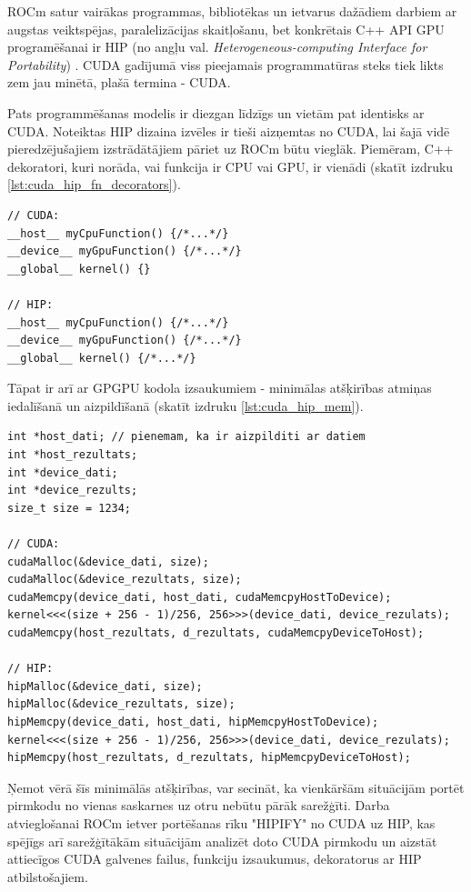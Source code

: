 ROCm satur vairākas programmas, bibliotēkas un ietvarus dažādiem darbiem ar
augstas veiktspējas, paralelizācijas skaitļošanu, bet konkrētais C++ API 
GPU programēšanai ir HIP (no angļu val. \textit{Heterogeneous-computing
Interface for Portability}) \cite{HIP_docs}. CUDA gadījumā viss pieejamais
programmatūras steks tiek likts zem jau minētā, plašā termina - CUDA.

Pats programmēšanas modelis ir diezgan līdzīgs un vietām pat identisks ar
CUDA. Noteiktas HIP dizaina izvēles ir tieši aizņemtas no CUDA, lai šajā vidē
pieredzējušajiem izstrādātājiem pāriet uz ROCm būtu vieglāk. Piemēram, C++
dekoratori, kuri norāda, vai funkcija ir CPU vai GPU, ir vienādi (skatīt 
izdruku \ref{lst:cuda_hip_fn_decorators}).

\begin{lstlisting}[caption={CUDA un HIP funkciju definīciju salīdzinājums},
  label=lst:cuda_hip_fn_decorators,
  captionpos=b
]
// CUDA:
__host__ myCpuFunction() {/*...*/}
__device__ myGpuFunction() {/*...*/}
__global__ kernel() {}

// HIP:
__host__ myCpuFunction() {/*...*/}
__device__ myGpuFunction() {/*...*/}
__global__ kernel() {/*...*/}
\end{lstlisting}

Tāpat ir arī ar GPGPU kodola izsaukumiem - minimālas atšķirības atmiņas
iedalīšanā un aizpildīšanā (skatīt izdruku \ref{lst:cuda_hip_mem}).

\begin{lstlisting}[caption={CUDA un HIP kodola darbināšanas, atmiņas API
    izsaukumu salīdzinājums},
  label=lst:cuda_hip_mem,
  captionpos=b
]
int *host_dati; // pienemam, ka ir aizpilditi ar datiem
int *host_rezultats;
int *device_dati;
int *device_rezults;
size_t size = 1234;

// CUDA:
cudaMalloc(&device_dati, size);
cudaMalloc(&device_rezultats, size);
cudaMemcpy(device_dati, host_dati, cudaMemcpyHostToDevice);
kernel<<<(size + 256 - 1)/256, 256>>>(device_dati, device_rezulats);
cudaMemcpy(host_rezultats, d_rezultats, cudaMemcpyDeviceToHost);

// HIP:
hipMalloc(&device_dati, size);
hipMalloc(&device_rezultats, size);
hipMemcpy(device_dati, host_dati, hipMemcpyHostToDevice);
kernel<<<(size + 256 - 1)/256, 256>>>(device_dati, device_rezulats);
hipMemcpy(host_rezultats, d_rezultats, hipMemcpyDeviceToHost);
\end{lstlisting}

Ņemot vērā šīs minimālās atšķirības, var secināt, ka vienkāršām situācijām
portēt pirmkodu no vienas saskarnes uz otru nebūtu pārāk sarežģīti. Darba
atvieglošanai ROCm ietver portēšanas rīku "HIPIFY"  \cite{HIPIFY_github} no
CUDA uz HIP, kas spējīgs arī sarežģītākām situācijām analizēt doto CUDA
pirmkodu un aizstāt attiecīgos CUDA galvenes failus, funkciju izsaukumus,
dekoratorus ar HIP atbilstošajiem.

